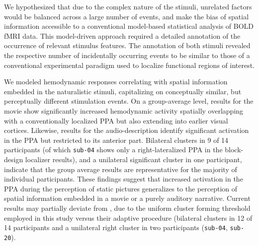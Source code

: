 \documentclass[english,11pt]{article}
\begin{document}
We hypothesized that due to the complex nature of the stimuli, unrelated factors
would be balanced across a large number of events, and make the bias of spatial
information accessible to a conventional model-based statistical analysis of BOLD
fMRI data.
This model-driven approach required a detailed annotation of the occurrence of
relevant stimulus features.
The annotation of both stimuli revealed the respective number of incidentally
occurring events to be similar to those of a conventional experimental paradigm
used to localize functional regions of interest.

We modeled hemodynamic responses correlating with spatial information embedded
in the naturalistic stimuli, capitalizing on conceptually similar, but
perceptually different stimulation events.
On a group-average level, results for the movie show significantly
increased hemodynamic activity spatially overlapping with a conventionally
localized PPA but also extending into earlier visual cortices.
Likewise, results for the audio-description identify significant activation in
the PPA but restricted to its anterior part.
Bilateral clusters in 9 of 14
participants (of which \texttt{sub-04} shows only a right-lateralized PPA
in the block-design localizer results), and a unilateral
significant cluster in one participant, indicate that the group average results
are representative for the majority of individual participants.
These findings suggest that increased activation in the PPA during the
perception of static pictures generalizes to the perception of spatial
information embedded in a movie or a purely auditory narrative.
%
Current results may partially deviate from \citet{sengupta2016extension}, due to
the uniform cluster forming threshold employed in this study versus their
adaptive procedure (bilateral clusters in 12 of 14 participants and a unilateral
right cluster in two participants (\texttt{sub-04}, \texttt{sub-20}).
\end{document}
